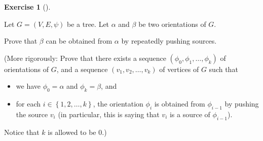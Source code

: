 \documentclass[numbers=enddot,12pt,final,onecolumn,notitlepage]{scrartcl}%
\newcounter{exer}
\theoremstyle{definition}
\newtheorem{exmp}[exer]{Exercise}
\newenvironment{exercise}[1][]
{\begin{exmp}[#1]\begin{leftbar}}
{\end{leftbar}\end{exmp}}
\newcommand{\set}[1]{\left\{ #1 \right\}}
\newcommand{\tup}[1]{\left( #1 \right)}
\begin{document}
\begin{exercise} \label{exe.mt3.aco.sink-push2}
Let $G = \tup{V, E, \psi}$ be a tree.
Let $\alpha$ and $\beta$ be two orientations of $G$.

Prove that $\beta$ can be obtained from $\alpha$ by
repeatedly pushing sources.

(More rigorously:
Prove that there exists a sequence
$\tup{\phi_0, \phi_1, \ldots, \phi_k}$ of
orientations of $G$, and a sequence
$\tup{v_1, v_2, \ldots, v_k}$ of vertices of $G$
such that
\begin{itemize}
\item we have $\phi_0 = \alpha$ and $\phi_k = \beta$, and
\item for each
      $i \in \set{1, 2, \ldots, k}$, the orientation $\phi_i$
      is obtained from $\phi_{i-1}$ by pushing the source $v_i$
      (in particular, this is saying that $v_i$ is a source of
      $\phi_{i-1}$).
\end{itemize}
Notice that $k$ is allowed to be $0$.)
\end{exercise}
\end{document}
